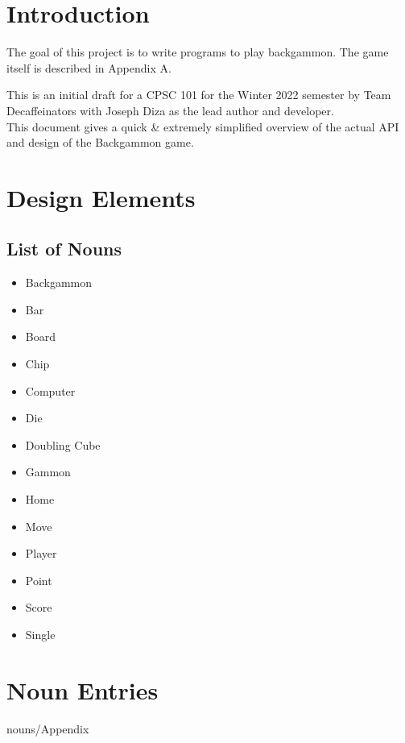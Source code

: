 \documentclass{report}
\begin{document}

\tableofcontents

\chapter{Introduction}

The goal of this project is to write programs to play backgammon. The game
itself is described in Appendix A.

This is an initial draft for a CPSC 101 for the Winter 2022 semester by Team Decaffeinators
with Joseph Diza as the lead author and developer.  \\

\noindent
This document gives a quick \& extremely simplified overview
of the actual API and design of the Backgammon game.

\chapter{Design Elements}

\section{List of Nouns}

\begin{multicols}{2}
    \begin{itemize}
        \item Backgammon
        \item Bar
        \item Board
        \item Chip
        \item Computer
        \item Die
        \item Doubling Cube
    \end{itemize}

    \begin{itemize}
        \item Gammon
        \item Home
        \item Move
        \item Player
        \item Point
        \item Score
        \item Single
    \end{itemize}
\end{multicols}

\chapter{Noun Entries}

















 {nouns/Appendix}
\end{document}
